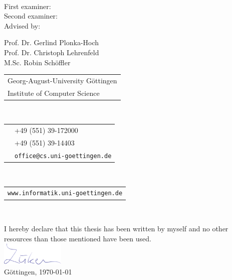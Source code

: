 \documentclass[a4paper, 11pt]{report}
\theoremstyle{definition}
\newcommand{\largetitlespace}{2.5em}
\begin{document}
\begin{titlepage}
\begin{center}
\begin{minipage}{.5\textwidth}
		\end{minipage}\\[\largetitlespace]
		\begin{minipage}{\textwidth}
			\centering
			\begin{minipage}{.32\textwidth}
				\flushright
				First examiner: \\
				Second examiner: \\
				Advised by:
			\end{minipage}
			\hspace{0.5em}
			\begin{minipage}{.45\textwidth}
				\flushleft
				Prof. Dr. Gerlind Plonka-Hoch\\
				Prof. Dr. Christoph Lehrenfeld\\
				M.Sc. Robin Schöffler
			\end{minipage}
		\end{minipage}
	\end{center}
\end{titlepage}
\pagebreak

\pagestyle{empty}
\restoregeometry
{}
\noindent
\begin{tabular}{l}
Georg-August-University Göttingen\\
Institute of Computer Science\\
\end{tabular}\\[1em]
\begin{tabular}{ll}
	\Telefon 	&+49 (551) 39-172000\\
	\FAX 		&+49 (551) 39-14403\\
	\Letter 	&\texttt{office@cs.uni-goettingen.de}\\
\end{tabular}\\[1em]
\begin{tabular}{l}
\texttt{www.informatik.uni-goettingen.de}\\
\end{tabular}\\[1em]
\pagebreak

\noindent I hereby declare that this thesis has been written by myself and no other resources than those mentioned have been used.\\[0.7em]
\phantom{H}\includegraphics[height=3em]{../assets/formal/sign.png}\\[0.5em]
Göttingen, \today \hspace{2em}
\pagebreak
\end{document}
